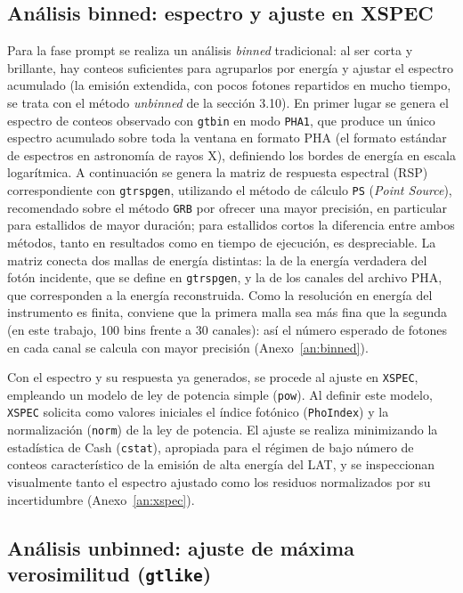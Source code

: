 \subsection{Análisis binned: espectro y ajuste en XSPEC}

Para la fase prompt se realiza un análisis \textit{binned} tradicional: al ser corta y brillante, hay conteos suficientes para agruparlos por energía y ajustar el espectro acumulado (la emisión extendida, con pocos fotones repartidos en mucho tiempo, se trata con el método \textit{unbinned} de la sección 3.10). En primer lugar se genera el espectro de conteos observado con \texttt{gtbin} en modo \texttt{PHA1}, que produce un único espectro acumulado sobre toda la ventana en formato PHA (el formato estándar de espectros en astronomía de rayos X), definiendo los bordes de energía en escala logarítmica. A continuación se genera la matriz de respuesta espectral (RSP) correspondiente con \texttt{gtrspgen}, utilizando el método de cálculo \texttt{PS} (\textit{Point Source}), recomendado sobre el método \texttt{GRB} por ofrecer una mayor precisión, en particular para estallidos de mayor duración; para estallidos cortos la diferencia entre ambos métodos, tanto en resultados como en tiempo de ejecución, es despreciable. La matriz conecta dos mallas de energía distintas: la de la energía verdadera del fotón incidente, que se define en \texttt{gtrspgen}, y la de los canales del archivo PHA, que corresponden a la energía reconstruida. Como la resolución en energía del instrumento es finita, conviene que la primera malla sea más fina que la segunda (en este trabajo, 100 bins frente a 30 canales): así el número esperado de fotones en cada canal se calcula con mayor precisión (Anexo~\ref{an:binned}).

Con el espectro y su respuesta ya generados, se procede al ajuste en \texttt{XSPEC}, empleando un modelo de ley de potencia simple (\texttt{pow}). Al definir este modelo, \texttt{XSPEC} solicita como valores iniciales el índice fotónico (\texttt{PhoIndex}) y la normalización (\texttt{norm}) de la ley de potencia. El ajuste se realiza minimizando la estadística de Cash (\texttt{cstat}), apropiada para el régimen de bajo número de conteos característico de la emisión de alta energía del LAT, y se inspeccionan visualmente tanto el espectro ajustado como los residuos normalizados por su incertidumbre (Anexo~\ref{an:xspec}).

\subsection{Análisis unbinned: ajuste de máxima verosimilitud (\texttt{gtlike})}

